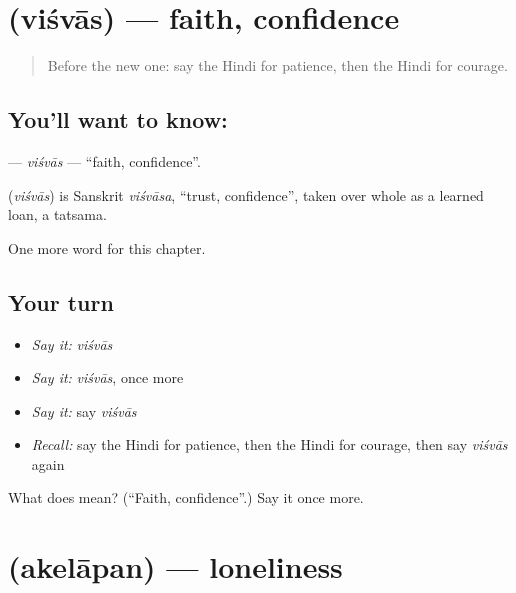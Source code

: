 \section[\texorpdfstring{\hi{विश्वास} (viśvās)}{विश्वास (viśvās)}]{ (viśvās) — faith, confidence}

\label{lesson:HI-C258-visvas}



\begin{quote}
Before the new one: say the Hindi for patience, then the Hindi for courage.
\end{quote}

\subsection*{You'll want to know: }
\textbf{} — \emph{viśvās} — \textquotedblleft{}faith, confidence\textquotedblright{}.

\begin{cousinweb}
\textbf{} (\emph{viśvās}) is Sanskrit \emph{viśvāsa}, \textquotedblleft{}trust, confidence\textquotedblright{}, taken over whole as a learned loan, a tatsama.
\end{cousinweb}

\begin{grammarlens}[title={What you've built}]
One more word for this chapter.
\end{grammarlens}

\subsection*{Your turn}
\begin{itemize}
\raggedright
  \item \emph{Say it:} \emph{viśvās}
  \item \emph{Say it:} \emph{viśvās}, once more
  \item \emph{Say it:} say \emph{viśvās}
  \item \emph{Recall:} say the Hindi for patience, then the Hindi for courage, then say \emph{viśvās} again
\end{itemize}

\begin{tcolorbox}[breakable,colback=teal!4,colframe=teal!35!black,title={Before you move on}]
What does  mean? (\textquotedblleft{}Faith, confidence\textquotedblright{}.) Say it once more.
\end{tcolorbox}
\section[\texorpdfstring{\hi{अकेलापन} (akelāpan)}{अकेलापन (akelāpan)}]{ (akelāpan) — loneliness}

